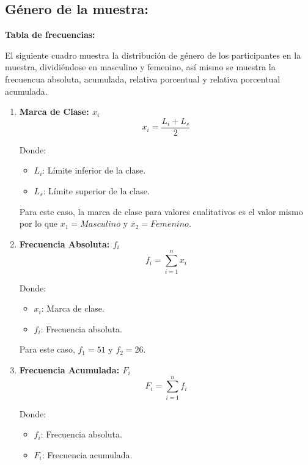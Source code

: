 \subsection{Género de la muestra:}
  
  \textbf{Tabla de frecuencias:}
  
  El siguiente cuadro muestra la distribución de género de los participantes en la muestra, dividiéndose en masculino y femenino, así mismo se muestra la frecuencua absoluta, acumulada, relativa porcentual y relativa porcentual acumulada.

  \begin{multicols}{2}
    \begin{enumerate}
      \item \begin{center}
        \textbf{Marca de Clase: $x_i$}
        \hrulefill
        \begin{equation*}
            x_i = \frac{L_i + L_s}{2}
        \end{equation*}
    \end{center}
    \vspace{-0.5cm}
    Donde:
    \begin{itemize}
        \item $L_i$: Límite inferior de la clase.
        \item $L_s$: Límite superior de la clase.
    \end{itemize}
    Para este caso, la marca de clase para valores cualitativos es el valor mismo por lo que $x_1 = Masculino$ y $x_2 = Femenino$.

    \item \begin{center}
        \textbf{Frecuencia Absoluta: $f_i$}
        \hrulefill
        \begin{equation*}
          f_i = \sum_{i=1}^{n} x_i
        \end{equation*}
    \end{center}
    \vspace{-0.7cm}
    Donde:
    \begin{itemize}
        \item $x_i$: Marca de clase.
        \item $f_i$: Frecuencia absoluta.
    \end{itemize}
    Para este caso, $f_1 = 51$ y $f_2 = 26$.

    \item \begin{center}
      \textbf{Frecuencia Acumulada: $F_i$}
      \hrulefill
      \begin{equation*}
        F_i = \sum_{i=1}^{n} f_i
      \end{equation*}
    \end{center}
    \vspace{-0.5cm}
    Donde:
    \begin{itemize}
        \item $f_i$: Frecuencia absoluta.
        \item $F_i$: Frecuencia acumulada.
    \end{itemize}


\end{enumerate}
\end{multicols}
